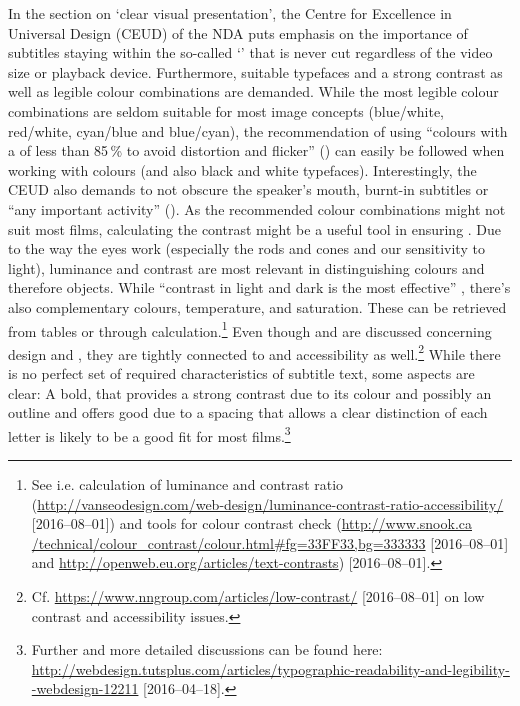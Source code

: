 In the section on ‘clear visual presentation’, the Centre for Excellence in Universal Design (CEUD) of the NDA puts emphasis on the importance of subtitles staying within the so-called ‘’ that is never cut regardless of the video size or playback device. Furthermore, suitable typefaces and a strong contrast as well as legible colour combinations are demanded. While the most legible colour combinations are seldom suitable for most image concepts (blue/white, red/white, cyan/blue and blue/cyan), the recommendation of using “colours with a  of less than 85\,\% to avoid distortion and flicker” (\citealt{nda????}) can easily be followed when working with colours (and also black and white typefaces). Interestingly, the CEUD also demands to not obscure the speaker’s mouth, burnt-in subtitles or “any important activity” (\citealt{nda????}). As the recommended colour combinations might not suit most films, calculating the contrast might be a useful tool in ensuring . Due to the way the eyes work (especially the rods and cones and our sensitivity to light), luminance and contrast are most relevant in distinguishing colours and therefore objects. While “contrast in light and dark is the most effective” \citep{Bradley2016}, there’s also complementary colours, temperature, and saturation. These can be retrieved from tables or through calculation.\footnote{See i.e. calculation of luminance and contrast ratio (\url{http://vanseodesign.com/web-design/luminance-contrast-ratio-accessibility/} [2016--08--01]) and tools for colour contrast check (\url{http://www.snook.ca /technical/colour\_contrast/colour.html\#fg=33FF33,bg=333333} [2016--08--01] and \url{http://openweb.eu.org/articles/text-contrasts}) [2016--08--01].} Even though  and  are discussed concerning design and , they are tightly connected to  and accessibility as well.\footnote{Cf. \url{https://www.nngroup.com/articles/low-contrast/} [2016--08--01] on low contrast and accessibility issues.} While there is no perfect set of required characteristics of subtitle text, some aspects are clear: A bold,   that provides a strong contrast due to its colour and possibly an outline and offers good  due to a spacing that allows a clear distinction of each letter is likely to be a good fit for most films.\footnote{Further and more detailed discussions can be found here: \url{http://webdesign.tutsplus.com/articles/typographic-readability-and-legibility--webdesign-12211} [2016--04--18].}

